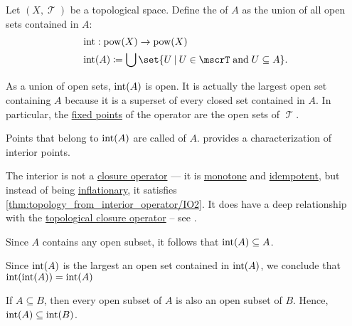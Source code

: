 \begin{definition}\label{def:topological_interior_operator}
  Let \( (X, \mscrT) \) be a topological space. Define the  of \( A \) as the union of all open sets contained in \( A \):
  \begin{equation*}
    \begin{aligned}
      &\Int: \pow(X) \to \pow(X) \\
      &\Int(A) \coloneqq \bigcup \set{ U \given U \in \mscrT \T{and} U \subseteq A }.
    \end{aligned}
  \end{equation*}

  As a union of open sets, \( \operatorname{int}(A) \) is open. It is actually the largest open set containing \( A \) because it is a superset of every closed set contained in \( A \). In particular, the \hyperref[def:fixed_point]{fixed points} of the operator are the open sets of \( \mscrT \).

  Points that belong to \( \operatorname{int}(A) \) are called  of \( A \).  provides a characterization of interior points.

  The interior is not a \hyperref[def:closure_operator]{closure operator} --- it is \hyperref[def:order_homomorphism/increasing]{monotone} and \hyperref[def:magma/idempotent]{idempotent}, but instead of being \hyperref[def:inflationary_function]{inflationary}, it satisfies \ref{thm:topology_from_interior_operator/IO2}. It does have a deep relationship with the \hyperref[def:topological_closure_operator]{topological closure operator} -- see .
\end{definition}
\begin{defproof}
   Since \( A \) contains any open subset, it follows that \( \operatorname{int}(A) \subseteq A \).

   Since \( \operatorname{int}(A) \) is the largest an open set contained in \( \operatorname{int}(A) \), we conclude that \( \operatorname{int}(\operatorname{int}(A)) = \operatorname{int}(A) \)

   If \( A \subseteq B \), then every open subset of \( A \) is also an open subset of \( B \). Hence, \( \operatorname{int}(A) \subseteq \operatorname{int}(B) \).
\end{defproof}

